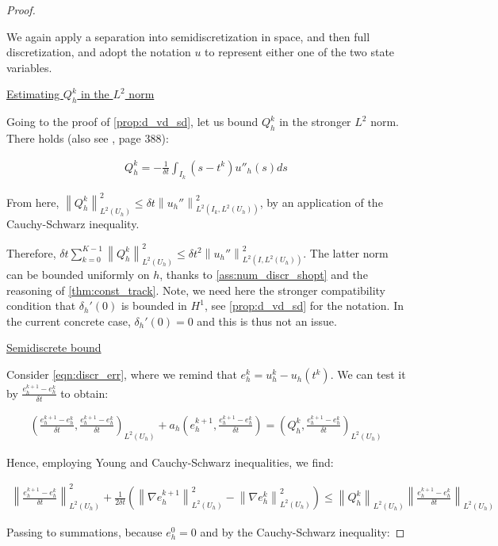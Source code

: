 \documentclass[english,a4paper,9pt,oneside]{scrbook}	%
\theoremstyle{break}
\newenvironment{mproof}[1][\proofname]{%
  \begin{proof}[#1]$ $\par\nobreak\ignorespaces
}{%
  \end{proof}
}
\renewcommand*{\proofname}{Proof}
\theoremstyle{remark}
\newcommand{\ds}{\displaystyle}
\newcommand{\norm}[1]{\left\lVert#1\right\rVert}
\begin{document}
\begin{mproof}
We again apply a separation into semidiscretization in space, and then full discretization, and adopt the notation $u$ to represent either one of the two state variables.

\underline{Estimating $Q_h^k$ in the $L^2$ norm}

Going to the proof of \cref{prop:d_vd_sd}, let us bound $Q_h^k$ in the stronger $L^2$ norm. There holds (also see \cite{quarteroni}, page 388):

\begin{align*}
	Q_h^k = -\frac{1}{\delta t}\int_{I_k}(s-t^k)u''_h(s)ds
\end{align*}

From here, $\norm{Q_h^k}_{L^2(U_h)}^2\leq \delta t \norm{u_h''}_{L^2(I_k,{L^2(U_h)})}^2$, by an application of the Cauchy-Schwarz inequality. 

Therefore, $\delta t \sum_{k=0}^{K-1} \norm{Q_h^k}_{L^2(U_h)}^2\leq \delta t^2 \norm{u_h''}_{L^2(I,{L^2(U_h)})}^2$. The latter norm can be bounded uniformly on $h$, thanks to \cref{ass:num_discr_shopt} and the reasoning of \cref{thm:const_track}. Note, we need here the stronger compatibility condition that $\delta_h'(0)$ is bounded in $H^1$, see \cref{prop:d_vd_sd} for the notation. In the current concrete case, $\delta_h'(0) = 0$ and this is thus not an issue.

\underline{Semidiscrete bound}

Consider \cref{eqn:discr_err}, where we remind that $e_h^k = u_h^k-u_h(t^k)$. We can test it by $\ds \frac{e_h^{k+1}-e_h^k}{\delta t}$ to obtain:

\begin{align*}
\left ( \frac{e_{h}^{k+1}-e_h^k}{\delta t}, \frac{e_{h}^{k+1}-e_h^k}{\delta t}\right)_{L^2(U_h)} + a_h \left (e_h^{k+1}, \frac{e_{h}^{k+1}-e_h^k}{\delta t} \right ) = \left ( Q_h^k,\frac{e_{h}^{k+1}-e_h^k}{\delta t}\right)_{L^2(U_h)}
\end{align*}

Hence, employing Young and Cauchy-Schwarz inequalities, we find:

\begin{align*}
\norm{ \frac{e_{h}^{k+1}-e_h^k}{\delta t}}_{L^2(U_h)}^2 + \frac{1}{2\delta t}\left (\norm{\nabla e_h^{k+1}}^2_{L^2(U_h)} - \norm{\nabla e_h^k}^2_{L^2(U_h)}\right)\leq  \norm{Q_h^k}_{L^2(U_h)} \norm{\frac{e_{h}^{k+1}-e_h^k}{\delta t}}_{L^2(U_h)}
\end{align*}

Passing to summations, because $e_h^0=0$ and by the Cauchy-Schwarz inequality:


\end{mproof}
\end{document}
